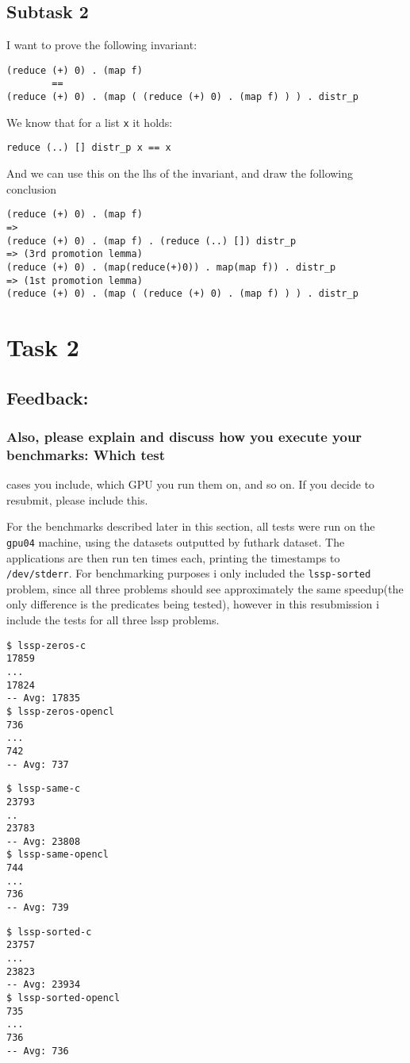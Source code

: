 \documentclass[11pt]{article}
\begin{document}
\subsection{Subtask 2}
\label{sec:org895fdfa}
I want to prove the following invariant:
\begin{verbatim}
(reduce (+) 0) . (map f)
	    ==
(reduce (+) 0) . (map ( (reduce (+) 0) . (map f) ) ) . distr_p
\end{verbatim}
We know that for a list \texttt{x} it holds:
\begin{verbatim}
reduce (..) [] distr_p x == x
\end{verbatim}
And we can use this on the lhs of the invariant, and draw the following conclusion
\begin{verbatim}
(reduce (+) 0) . (map f)
=>
(reduce (+) 0) . (map f) . (reduce (..) []) distr_p
=> (3rd promotion lemma)
(reduce (+) 0) . (map(reduce(+)0)) . map(map f)) . distr_p
=> (1st promotion lemma)
(reduce (+) 0) . (map ( (reduce (+) 0) . (map f) ) ) . distr_p
\end{verbatim}

\section{Task 2}
\label{sec:org975fc40}
\subsection{Feedback:}
\label{sec:org1b6ac20}
\subsubsection{Also, please explain and discuss how you execute your benchmarks: Which test}
\label{sec:orgfb57488}
cases you include, which GPU you run them on, and so on. If you decide to
resubmit, please include this.

For the benchmarks described later in this section, all tests were run on the
\texttt{gpu04} machine, using the datasets outputted by futhark dataset. The applications are
then run ten times each, printing the timestamps to \texttt{/dev/stderr}. For benchmarking purposes
i only included the \texttt{lssp-sorted} problem, since all three problems should see approximately
the same speedup(the only difference is the predicates being tested), however in this resubmission
i include the tests for all three lssp problems.
\begin{verbatim}
$ lssp-zeros-c
17859
...
17824
-- Avg: 17835
$ lssp-zeros-opencl
736
...
742
-- Avg: 737
\end{verbatim}
\begin{verbatim}
$ lssp-same-c
23793
..
23783
-- Avg: 23808
$ lssp-same-opencl
744
...
736
-- Avg: 739
\end{verbatim}
\begin{verbatim}
$ lssp-sorted-c
23757
...
23823
-- Avg: 23934
$ lssp-sorted-opencl
735
...
736
-- Avg: 736
\end{verbatim}
\end{document}
